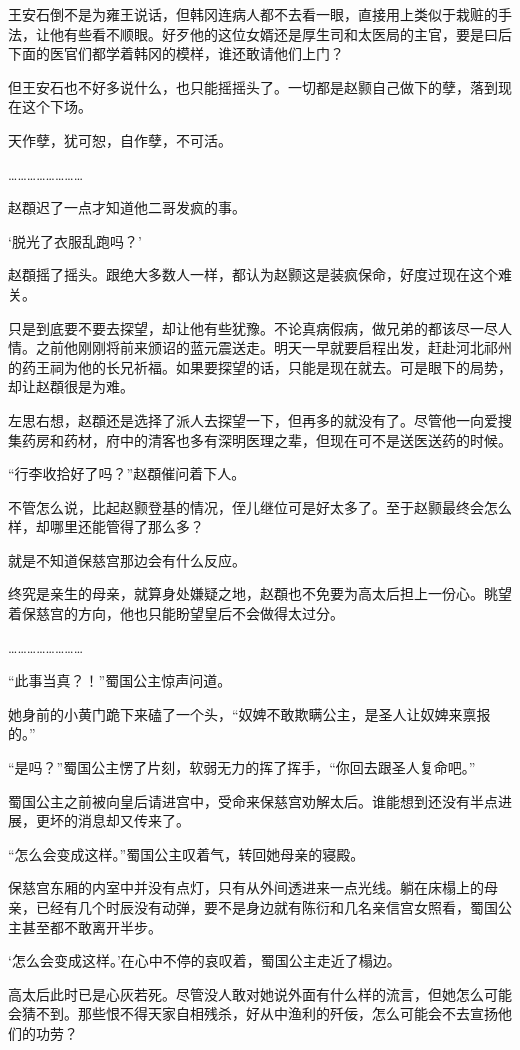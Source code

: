 王安石倒不是为雍王说话，但韩冈连病人都不去看一眼，直接用上类似于栽赃的手法，让他有些看不顺眼。好歹他的这位女婿还是厚生司和太医局的主官，要是曰后下面的医官们都学着韩冈的模样，谁还敢请他们上门？

但王安石也不好多说什么，也只能摇摇头了。一切都是赵颢自己做下的孽，落到现在这个下场。

天作孽，犹可恕，自作孽，不可活。

……………………

赵頵迟了一点才知道他二哥发疯的事。

‘脱光了衣服乱跑吗？’

赵頵摇了摇头。跟绝大多数人一样，都认为赵颢这是装疯保命，好度过现在这个难关。

只是到底要不要去探望，却让他有些犹豫。不论真病假病，做兄弟的都该尽一尽人情。之前他刚刚将前来颁诏的蓝元震送走。明天一早就要启程出发，赶赴河北祁州的药王祠为他的长兄祈福。如果要探望的话，只能是现在就去。可是眼下的局势，却让赵頵很是为难。

左思右想，赵頵还是选择了派人去探望一下，但再多的就没有了。尽管他一向爱搜集药房和药材，府中的清客也多有深明医理之辈，但现在可不是送医送药的时候。

“行李收拾好了吗？”赵頵催问着下人。

不管怎么说，比起赵颢登基的情况，侄儿继位可是好太多了。至于赵颢最终会怎么样，却哪里还能管得了那么多？

就是不知道保慈宫那边会有什么反应。

终究是亲生的母亲，就算身处嫌疑之地，赵頵也不免要为高太后担上一份心。眺望着保慈宫的方向，他也只能盼望皇后不会做得太过分。

……………………

“此事当真？！”蜀国公主惊声问道。

她身前的小黄门跪下来磕了一个头，“奴婢不敢欺瞒公主，是圣人让奴婢来禀报的。”

“是吗？”蜀国公主愣了片刻，软弱无力的挥了挥手，“你回去跟圣人复命吧。”

蜀国公主之前被向皇后请进宫中，受命来保慈宫劝解太后。谁能想到还没有半点进展，更坏的消息却又传来了。

“怎么会变成这样。”蜀国公主叹着气，转回她母亲的寝殿。

保慈宫东厢的内室中并没有点灯，只有从外间透进来一点光线。躺在床榻上的母亲，已经有几个时辰没有动弹，要不是身边就有陈衍和几名亲信宫女照看，蜀国公主甚至都不敢离开半步。

‘怎么会变成这样。’在心中不停的哀叹着，蜀国公主走近了榻边。

高太后此时已是心灰若死。尽管没人敢对她说外面有什么样的流言，但她怎么可能会猜不到。那些恨不得天家自相残杀，好从中渔利的歼佞，怎么可能会不去宣扬他们的功劳？

